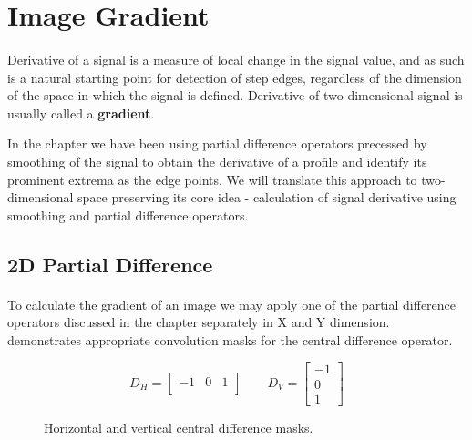 \section{Image Gradient}

\paragraph*{}
Derivative of a signal is a measure of local change in the signal value, and as such is a natural starting point for detection of step edges, regardless of the dimension of the space in which the signal is defined. Derivative of two-dimensional signal is usually called a \textbf{gradient}. 

In the  chapter we have been using partial difference operators precessed by smoothing of the signal to obtain the derivative of a profile and identify its prominent extrema as the edge points. We will translate this approach to two-dimensional space preserving its core idea - calculation of signal derivative using smoothing and partial difference operators.

\subsection{2D Partial Difference}

\paragraph*{}
To calculate the gradient of an image we may apply one of the partial difference operators discussed in the  chapter separately in X and Y dimension.  demonstrates appropriate convolution masks for the central difference operator.

\begin{figure}[h!]
\begin{equation*}
D_{H} = 
	\begin{bmatrix}
	-1 & 0 & 1 \\
	\end{bmatrix}\qquad
D_{V} = 
	\begin{bmatrix}
	-1 \\
	0 \\
	1
	\end{bmatrix}
\end{equation*}
\caption{Horizontal and vertical central difference masks.}
\label{fig:CentralDifferenceMasks}
\end{figure}

